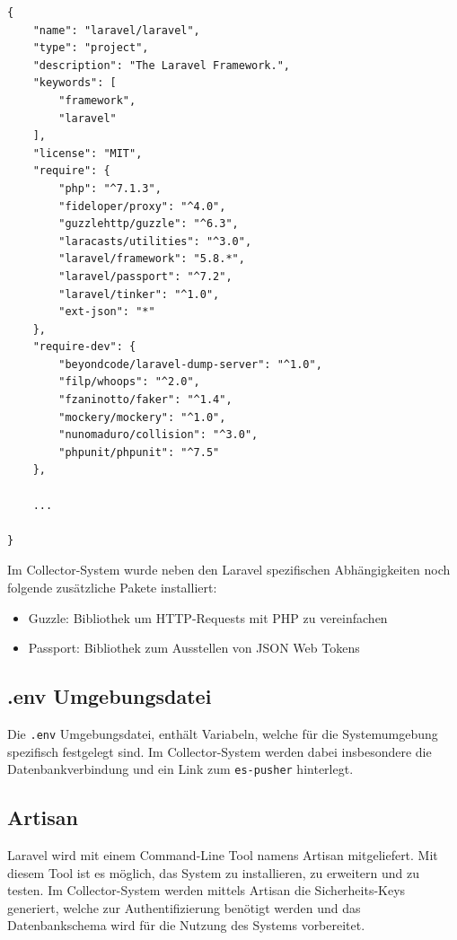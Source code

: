         \begin{lstlisting}[caption={Ausschnitt composer.json für das Collector-System}]
{
    "name": "laravel/laravel",
    "type": "project",
    "description": "The Laravel Framework.",
    "keywords": [
        "framework",
        "laravel"
    ],
    "license": "MIT",
    "require": {
        "php": "^7.1.3",
        "fideloper/proxy": "^4.0",
        "guzzlehttp/guzzle": "^6.3",
        "laracasts/utilities": "^3.0",
        "laravel/framework": "5.8.*",
        "laravel/passport": "^7.2",
        "laravel/tinker": "^1.0",
        "ext-json": "*"
    },
    "require-dev": {
        "beyondcode/laravel-dump-server": "^1.0",
        "filp/whoops": "^2.0",
        "fzaninotto/faker": "^1.4",
        "mockery/mockery": "^1.0",
        "nunomaduro/collision": "^3.0",
        "phpunit/phpunit": "^7.5"
    },
    
    ...
    
}
     \end{lstlisting}
     
     Im Collector-System wurde neben den Laravel spezifischen Abhängigkeiten noch folgende zusätzliche Pakete installiert:
        
        \begin{itemize}
            \item Guzzle: Bibliothek um HTTP-Requests mit PHP zu vereinfachen
            \item Passport: Bibliothek zum Ausstellen von JSON Web Tokens
        \end{itemize}
    
    \subsection{.env Umgebungsdatei}
        Die \texttt{.env} Umgebungsdatei, enthält Variabeln, welche für die Systemumgebung spezifisch festgelegt sind. Im Collector-System werden dabei insbesondere die Datenbankverbindung und ein Link zum \texttt{es-pusher} hinterlegt.
        
    \subsection{Artisan}
        Laravel wird mit einem Command-Line Tool namens Artisan mitgeliefert. Mit diesem Tool ist es möglich, das System zu installieren, zu erweitern und zu testen. Im Collector-System werden mittels Artisan die Sicherheits-Keys generiert, welche zur Authentifizierung benötigt werden und das Datenbankschema wird für die Nutzung des Systems vorbereitet.
        
